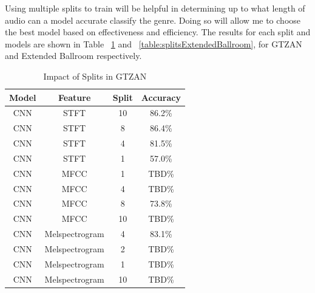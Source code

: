 \documentclass[10pt,twocolumn,letterpaper]{article}
\begin{document}
	Using multiple splits to train will be helpful in determining up to what length of audio can a model accurate classify the genre. Doing so will allow me to choose the best model based on effectiveness and efficiency. The results for each split and models are shown in Table ~\ref{table:splitsGTZAN} and ~\ref{table:splitsExtendedBallroom}, for GTZAN and Extended Ballroom respectively.
	
	\begin{table}[!htbp] %
		\caption{Impact of Splits in GTZAN}
		\centering
		\begin{tabular}[b]{cccc}
			\hline \hline
			Model & Feature & Split & Accuracy 	\\ [0.5ex]
			\hline
			CNN & STFT &  10 & 86.2\%			\\
			CNN & STFT &  8 & 86.4\%			\\
			CNN & STFT &  4 & 81.5\%				\\
			CNN & STFT &  1 & 57.0\%				\\
			CNN & MFCC &  1 & TBD\%				\\
			CNN & MFCC &  4 & TBD\%				\\
			CNN & MFCC &  8 & 73.8\%			\\
			CNN & MFCC &  10 & TBD\%			\\
			CNN & Melspectrogram & 4 & 83.1\% 	\\
			CNN & Melspectrogram & 2 & TBD\% 	\\
			CNN & Melspectrogram & 1 & TBD\% 	\\
			CNN & Melspectrogram & 10 & TBD\% 	\\ [1ex]
		\end{tabular}
	\label{table:splitsGTZAN}
	\end{table}
\end{document}
